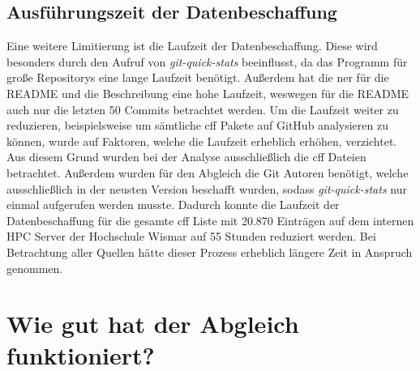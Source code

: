 \subsection*{Ausführungszeit der Datenbeschaffung}
\label{sec:ausfuehrungszeit_der_datenbeschaffung}
Eine weitere Limitierung ist die Laufzeit der Datenbeschaffung.
Diese wird besonders durch den Aufruf von \emph{git-quick-stats} beeinflusst, da das Programm für große Repositorys eine lange Laufzeit benötigt.
Außerdem hat die \gls{ner} für die README und die Beschreibung eine hohe Laufzeit, weswegen für die README auch nur die letzten 50 Commits betrachtet werden.
Um die Laufzeit weiter zu reduzieren, beispielsweise um sämtliche \gls{cff} Pakete auf GitHub analysieren zu können, wurde auf Faktoren, welche die Laufzeit erheblich erhöhen, verzichtet.
Aus diesem Grund wurden bei der Analyse ausschließlich die \gls{cff} Dateien betrachtet.
Außerdem wurden für den Abgleich die Git Autoren benötigt, welche ausschließlich in der neusten Version beschafft wurden, sodass \emph{git-quick-stats} nur einmal aufgerufen werden musste.
Dadurch konnte die Laufzeit der Datenbeschaffung für die gesamte \gls{cff} Liste mit 20.870 Einträgen auf dem internen HPC Server der Hochschule Wismar auf 55 Stunden reduziert werden.
Bei Betrachtung aller Quellen hätte dieser Prozess erheblich längere Zeit in Anspruch genommen.

\section{Wie gut hat der Abgleich funktioniert?}
\label{sec:abgleich_diskussion}

